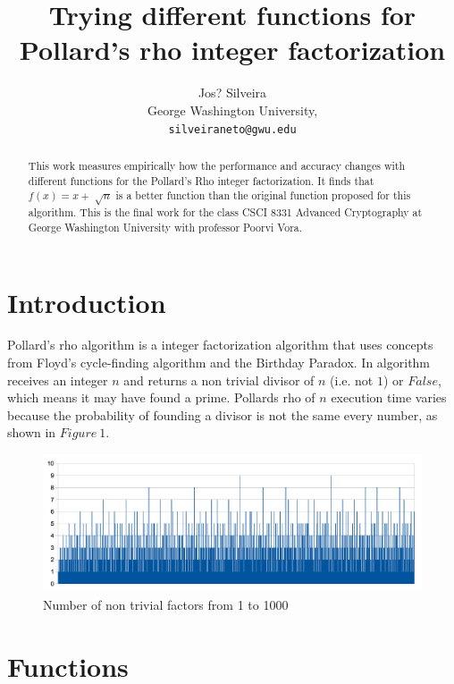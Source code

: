 \documentclass{article}
\title{Trying different functions for Pollard's rho integer factorization}
\author{Jos? Silveira \\
  George Washington University,\\
  \texttt{silveiraneto@gwu.edu}}
\date{\vspace{-5ex}}
\begin{document}
\maketitle

\begin{abstract}
This work measures empirically how the performance and accuracy changes with different functions for the Pollard's Rho integer factorization. It finds that $f(x) = x+\sqrt[]{n}$ is a better function than the original function proposed for this algorithm. This is the final work for the class CSCI 8331 Advanced Cryptography at George Washington University with professor Poorvi Vora. 
\end{abstract}

\section{Introduction}

Pollard's rho algorithm is a integer factorization algorithm that uses concepts from Floyd's cycle-finding algorithm and the Birthday Paradox. In algorithm receives an integer $n$ and returns a non trivial divisor of $n$ (i.e. not $1$) or $False$, which means it may have found a prime. Pollards rho of $n$ execution time varies because the probability of founding a divisor is not the same every number, as shown in $Figure\ 1$.

\begin{figure}[h!]
\centering
\includegraphics[scale=0.35]{factors.png}
\caption{Number of non trivial factors from 1 to 1000}
\label{fig1}
\end{figure}


\section{Functions}
\end{document}

